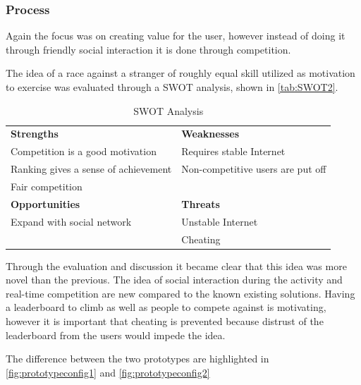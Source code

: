 \subsubsection{Process}
Again the focus was on creating value for the user, however instead of doing it through friendly social interaction it is done through competition. 

The idea of a race against a stranger of roughly equal skill utilized as motivation to exercise was evaluated through a \ac{SWOT} analysis, shown in \autoref{tab:SWOT2}.

\begin{table}[!ht]
	\begin{tabular}{| l | l |}
		\hline
		\textbf{Strengths} & \textbf{Weaknesses} \\ 
		Competition is a good motivation & Requires stable Internet \\ 
		Ranking gives a sense of achievement & Non-competitive users are put off \\
		Fair competition & \\ \hline
		\textbf{Opportunities} & \textbf{Threats} \\ 
		Expand with social network & Unstable Internet \\
		& Cheating \\
		\hline
	\end{tabular}
	\caption{SWOT Analysis}
	\label{tab:SWOT2}
\end{table}

Through the evaluation and discussion it became clear that this idea was more novel than the previous. The idea of social interaction during the activity and real-time competition are new compared to the known existing solutions. Having a leaderboard to climb as well as people to compete against is motivating, however it is important that cheating is prevented because distrust of the leaderboard from the users would impede the idea.

The difference between the two prototypes are highlighted in \autoref{fig:prototypeconfig1} and \autoref{fig:prototypeconfig2}

